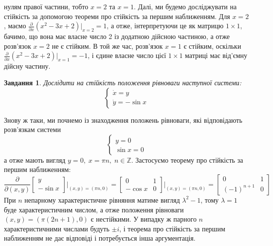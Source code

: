 \documentclass[12pt]{article} %
\newtheorem{prob}{Завдання}
\begin{document}
нулям правої частини, тобто $x=2$ та $x=1$. Далі, ми будемо досліджувати на стійкість за допомогою теореми про стійкість за першим
наближенням. Для $x=2$, маємо $\frac{\partial}{\partial x}(x^2-3x+2)\bigg|_{x=2}=1$, а отже, інтерпретуючи це як матрицю
$1\times1$, бачимо, що вона має власне число 2 із додатною дійсною частиною, а отже розв’язок $x=2$ не є стійким. В той же час, 
розв’язок $x=1$ є стійким, оскільки $\frac{\partial}{\partial x}(x^2-3x+2)\bigg|_{x=1}=-1$, і єдине власне число цієї $1\times1$ 
матриці має від’ємну дійсну частину.
\begin{prob}Дослідити на стійкість положення рівноваги наступної системи:
	\[\begin{cases}\dot{x}=y\\\dot{y}=-\sin x\end{cases}\]\end{prob}
	Знову ж таки, ми почнемо із знаходження положень рівноваги,
	які відповідають розв’язкам системи \[\begin{cases}y=0\\\sin x=0\end{cases}\]
	а отже мають вигляд $y=0,\;x=\pi n,\;n\in\mathbb{Z}$. Застосуємо теорему про стійкість за першим наближенням:
	\[\frac{\partial}{\partial (x,y)} \begin{bmatrix}y\\-\sin x\end{bmatrix}\bigg|_{(x,y)=(\pi n,0)}
		=\begin{bmatrix}0&1\\-\cos x&0\end{bmatrix}\bigg|_{(x,y)=(\pi n,0)}=\begin{bmatrix}0&1\\(-1)^{n+1}&0\end{bmatrix}\]
	При $n$ непарному характеристичне рівняння матиме вигляд $\lambda^2-1$, тому $\lambda=1$ буде характеристичним числом,
	а отже положення рівноваги $(x,y)=(\pi(2n+1),0)$ є нестійкими. У випадку ж парного $n$ характеристичними числами будуть
	$\pm i$, і теорема про стійкість за першим наближенням не дає відповіді і потребується інша аргументація. 
	
\end{document}

